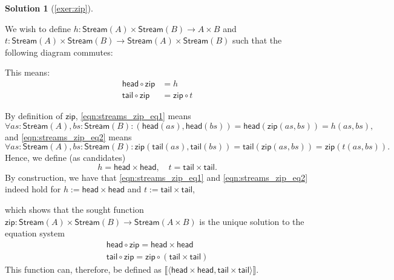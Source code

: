\documentclass[a4paper,11pt, oneside,titlepage=false]{scrbook}
\theoremstyle{plain}
\theoremstyle{definition}
\newtheorem{solution}[thm]{Solution}
\newcommand{\cfont}[1]{\ensuremath{\mathsf{#1}}}
\newcommand{\Id}[1][]{\cfont{id}_{#1}}
\newcommand{\anam}[1]{\llbracket #1 \rrbracket} %
\newcommand{\co}[2]{\ensuremath{#2 \circ #1}}
\newcommand{\Stream}{\ensuremath{\mathsf{Stream}}}
\newcommand{\tail}{\ensuremath{\mathsf{tail}}}
\newcommand{\head}{\ensuremath{\mathsf{head}}}
\newcommand{\zip}{\ensuremath{\mathsf{zip}}}
\begin{document}
\begin{solution}[\cref{exer:zip}]\label{sol:zip}

We wish to define $h : \Stream(A)\times\Stream(B)\to A\times B$ and $t: \Stream(A)\times\Stream(B)\to \Stream(A)\times \Stream(B)$ such that the following diagram commutes:
	\begin{center}
	\end{center}

	This means:
	\begin{align}
	\co{\zip}{\head} &= h \label{eqn:streams_zip_eq1} \\
	\co{\zip}{\tail} &= \co{t}{\zip} \label{eqn:streams_zip_eq2}
	\end{align}

	By definition of $\zip$, \cref{eqn:streams_zip_eq1} means
	\[
	\forall as : \Stream(A), bs : \Stream(B): (\head(as),\head(bs)) = \head(\zip(as,bs)) = h(as,bs),
	\]
	and \cref{eqn:streams_zip_eq2} means
	\[
	\forall as : \Stream(A), bs : \Stream(B): \zip (\tail(as),\tail(bs)) = \tail(\zip(as,bs)) = \zip (t(as,bs)).
	\]
	Hence, we define (as candidates)
	\[
	h = \head\times\head, \quad t = \tail\times\tail.
	\]
	By construction, we have that \cref{eqn:streams_zip_eq1} and \cref{eqn:streams_zip_eq2} indeed hold for $h := \head\times\head$ and $t := \tail\times\tail$,

  which shows that the sought function $\zip : \Stream(A) \times \Stream(B) \to \Stream(A\times B)$ is the unique solution to the equation system
  \begin{align*}
    \co \zip \head = \head\times\head
    \\
    \co \zip \tail = \co{(\tail\times\tail)}{\zip}
  \end{align*}
  This function can, therefore, be defined as $\anam{ {\langle \head \times \head, \tail \times \tail \rangle} }$.
\end{solution}
\end{document}
